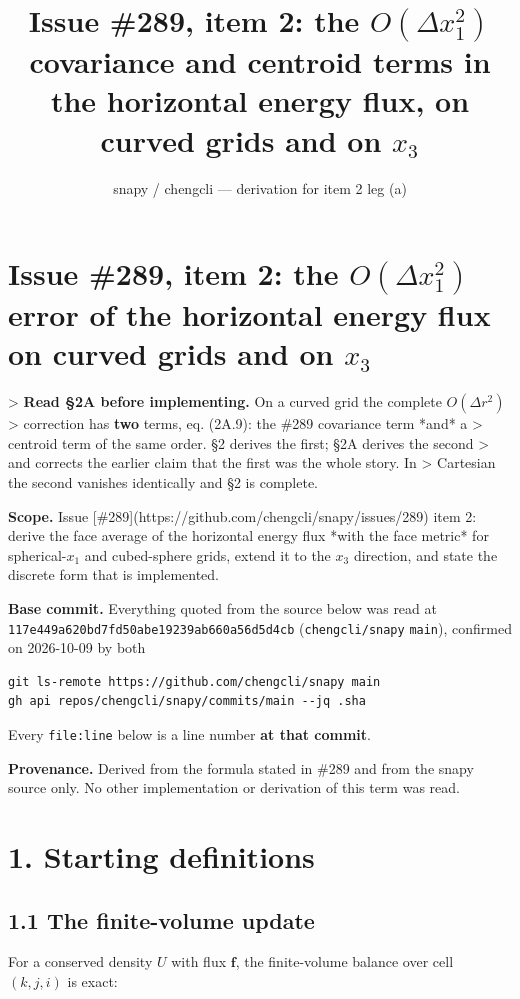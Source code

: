 \documentclass[11pt,a4paper]{article}
\title{Issue \#289, item 2: the $O(\Delta x_1^2)$ covariance and centroid terms
in the horizontal energy flux, on curved grids and on $x_3$}
\author{snapy / chengcli --- derivation for item 2 leg (a)}
\date{}
\begin{document}
\maketitle
\section*{Issue \#289, item 2: the $O(\Delta x_1^2)$ error of the horizontal energy flux on curved grids and on $x_3$}

> \textbf{Read §2A before implementing.} On a curved grid the complete $O(\Delta r^2)$
> correction has \textbf{two} terms, eq. (2A.9): the \#289 covariance term *and* a
> centroid term of the same order. §2 derives the first; §2A derives the second
> and corrects the earlier claim that the first was the whole story. In
> Cartesian the second vanishes identically and §2 is complete.

\textbf{Scope.} Issue [\#289](https://github.com/chengcli/snapy/issues/289) item 2: derive
the face average of the horizontal energy flux *with the face metric* for
spherical-$x_1$ and cubed-sphere grids, extend it to the $x_3$ direction, and
state the discrete form that is implemented.

\textbf{Base commit.} Everything quoted from the source below was read at
\texttt{117e449a620bd7fd50abe19239ab660a56d5d4cb} (\texttt{chengcli/snapy} \texttt{main}), confirmed
on 2026-10-09 by both

\begin{lstlisting}
git ls-remote https://github.com/chengcli/snapy main
gh api repos/chengcli/snapy/commits/main --jq .sha
\end{lstlisting}

Every \texttt{file:line} below is a line number \textbf{at that commit}.

\textbf{Provenance.} Derived from the formula stated in \#289 and from the snapy
source only. No other implementation or derivation of this term was read.

\hrulefill

\section*{1. Starting definitions}

\subsection*{1.1 The finite-volume update}

For a conserved density $U$ with flux $\mathbf{f}$, the finite-volume balance over
cell $(k,j,i)$ is exact:
\end{document}
